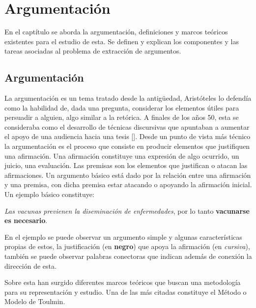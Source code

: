 \chapter{Argumentación}\label{chapter:argumentation}


En el captítulo se aborda la argumentación, definiciones y marcos teóricos existentes para el estudio de esta.
Se definen y explican los componentes y las tareas asociadas al problema de extracción de argumentos.  

\section{Argumentación}


La argumentación es un tema tratado desde la antigüedad, Aristóteles lo defendía como la 
habilidad de, dada una pregunta, considerar los elementos útiles para persuadir a alguien, algo
similar a la retórica. A finales de los años 50, esta se consideraba como el desarrollo de técnicas 
discursivas que apuntaban a aumentar el apoyo de una audiencia hacia una tesis [\cite{janier2019argument}]. 
Desde un punto de vista más técnico la argumentación es el proceso que consiste en producir elementos que 
justifiquen una afirmación. Una afirmación constituye una expresión de algo ocurrido, un juicio, una evaluación. 
Las premisas son los elementos que justifican o atacan las afirmaciones. Un argumento básico está dado por 
la relación entre una afirmación y una premisa, con dicha premisa estar atacando o apoyando la afirmación 
inicial. Un ejemplo básico constituye:

\begin{adjustwidth}{25pt}{25pt}
    \emph{Las vacunas previenen la diseminación de enfermedades}, por lo tanto \textbf{vacunarse es necesario}.
\end{adjustwidth}

En el ejemplo se puede observar un argumento simple y algunas características propias de estos, la justificación 
(en \textbf{negro}) que apoya la afirmación (en \emph{cursiva}), también se puede observar palabras conectoras 
que indican además de conexión la dirección de esta.

Sobre esta han surgido diferentes marcos teóricos que buscan una metodología para su representación y estudio. 
Una de las más citadas constituye el Método o Modelo de Toulmin.

